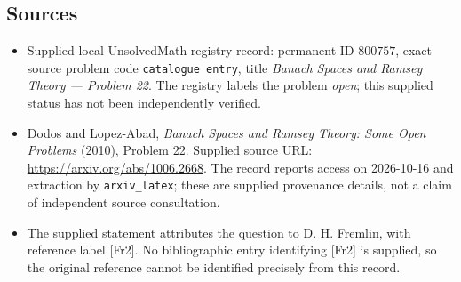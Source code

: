 \documentclass[11pt]{article}
\begin{document}
\subsection{Sources}
\begin{itemize}
\item Supplied local UnsolvedMath registry record: permanent ID \(800757\), exact source problem code \texttt{catalogue entry}, title \emph{Banach Spaces and Ramsey Theory --- Problem 22}. The registry labels the problem \emph{open}; this supplied status has not been independently verified.
\item Dodos and Lopez-Abad, \emph{Banach Spaces and Ramsey Theory: Some Open Problems} (2010), Problem 22. Supplied source URL: \url{https://arxiv.org/abs/1006.2668}. The record reports access on 2026-10-16 and extraction by \texttt{arxiv\_latex}; these are supplied provenance details, not a claim of independent source consultation.
\item The supplied statement attributes the question to D. H. Fremlin, with reference label [Fr2]. No bibliographic entry identifying [Fr2] is supplied, so the original reference cannot be identified precisely from this record.
\end{itemize}
\end{document}
